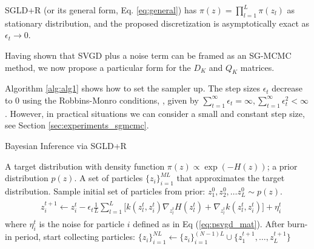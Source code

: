 \begin{proposition}
SGLD+R (or its general form, Eq. \eqref{eq:general}) has $\pi({z}) = \prod_{l=1}^L \pi({z}_l)$ as stationary distribution, and the proposed discretization is asymptotically exact as $\epsilon_t \rightarrow 0$.
\end{proposition}
\noindent Having shown that SVGD plus a noise term can be framed as an SG-MCMC method, we now propose a particular form for the ${D_K}$ and ${Q_K}$ matrices. %

Algorithm \ref{alg:alg1} shows how to set the sampler up. The step sizes $\epsilon_t$ decrease to $0$ using the Robbins-Monro conditions, \cite{robbins1951stochastic}, given by $\sum_{t=1}^\infty \epsilon_t = \infty, \sum_{t=1}^\infty \epsilon_t^2 < \infty$. However, in practical situations we can consider a small and constant step size, see Section \ref{sec:experiments_sgmcmc}. 

\begin{algorithm}[!h] %
\caption{Bayesian Inference via SGLD+R}  
\label{alg:alg1}
\begin{algorithmic}
 A target distribution with density function $\pi({z}) \propto \exp (-H({z}))$; a prior distribution $p({z})$. 
 A set of particles $\{{z}_i\}_{i=1}^{ML}$ that approximates the target distribution.  
\State Sample initial set of particles from prior: ${z}_1^0, {z}_2^0, \ldots {z}_L^0 \sim p({z})$.
\State 
\begin{align} \label{eq:psvgd_alg}
\begin{split}
&{z}_i^{t+1}  \gets  {z}_i^t  - \epsilon_t \frac{1}{L}\sum_{l=1}^L\big[  k({z}_l^t, {z}_i^t)  \nabla_{{z}_l^t} H({z}_l^t) + \nabla_{{z}_l^t} k({z}_l^t, {z}_i^t)\big] + {\eta}_i^t
\end{split}
\end{align}
\State where ${\eta}_i^t$ is the noise for particle $i$ defined as in Eq (\ref{eq:psvgd_mat}).
\State After  burn-in period, start collecting particles: $ \{{z}_i\}_{i=1}^{NL} \gets \{{z}_i\}_{i=1}^{(N-1)L} \cup \{ {z}_1^{t+1}, \ldots,  {z}_L^{t+1} \} $ 
\EndFor
\end{algorithmic}
\end{algorithm}

